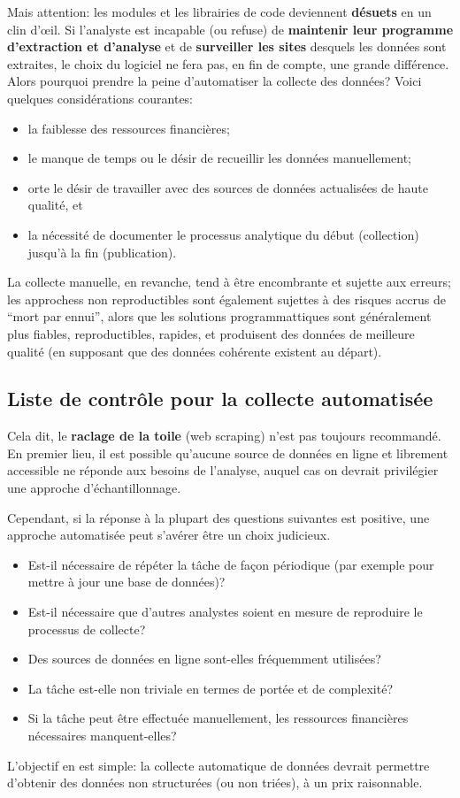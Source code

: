 Mais attention: les modules et les librairies de code deviennent \textbf{désuets} en un clin d'œil. Si l'analyste est incapable (ou refuse) de \textbf{maintenir leur programme d'extraction et d'analyse} et de \textbf{surveiller les sites} desquels les données sont extraites, le choix du logiciel ne fera pas, en fin de compte, une grande différence. 
\newpage\noindent
Alors pourquoi prendre la peine d'automatiser la collecte des données? Voici quelques considérations courantes:
\begin{itemize}[noitemsep]
    \item la faiblesse des ressources financières;
    \item le manque de temps ou le désir de recueillir les données manuellement;
\item orte le désir de travailler avec des sources de données actualisées de haute qualité, et  
\item la nécessité de documenter le processus analytique du début (collection) jusqu'à la fin (publication).
\end{itemize} 
La collecte manuelle, en revanche, tend à être encombrante et sujette aux erreurs; les approchess non reproductibles sont également sujettes à des risques accrus de ``mort par ennui'', alors que les solutions programmattiques sont généralement plus fiables, reproductibles, rapides, et produisent des données de meilleure qualité (en supposant que des données cohérente existent au départ). 
\subsection{Liste de contrôle pour la collecte automatisée} Cela dit, le \textbf{raclage de la toile} (web scraping) n'est pas toujours recommandé. En premier lieu, il est possible qu'aucune source de données en ligne et librement accessible ne réponde aux besoins de l'analyse, auquel cas on devrait privilégier une approche d'échantillonnage. \par Cependant, si la réponse à la plupart des questions suivantes est positive, une approche automatisée peut s’avérer être un choix judicieux.
\begin{itemize}[noitemsep]
\item Est-il nécessaire de répéter la tâche de façon périodique (par exemple pour mettre à jour une base de données)?
\item Est-il nécessaire que d'autres analystes soient en mesure de reproduire le processus de collecte?
\item Des sources de données en ligne sont-elles fréquemment utilisées?
\item La tâche est-elle non triviale en termes de portée et de complexité?
\item Si la tâche peut être effectuée manuellement, les ressources financières nécessaires manquent-elles?
\end{itemize}
L'objectif en est simple: la collecte automatique de données devrait permettre d'obtenir des données non structurées (ou non triées), à un prix raisonnable.
